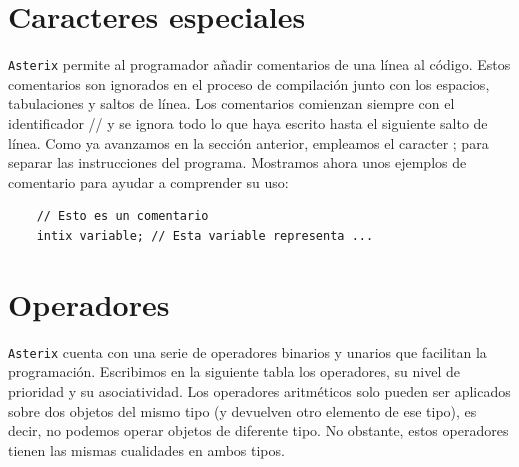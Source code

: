 \documentclass[a4paper, 10pt]{article}
\newcommand{\atx}{\texttt{Asterix} }
\begin{document}
    \section*{Caracteres especiales}
    \atx permite al programador añadir comentarios de una línea al código. Estos
    comentarios son ignorados en el proceso de compilación junto con los espacios,
    tabulaciones y saltos de línea. Los comentarios comienzan siempre con el
    identificador // y se ignora todo lo que haya escrito hasta el siguiente
    salto de línea. Como ya avanzamos en la sección anterior, empleamos el
    caracter \textsc{;} para separar las instrucciones del programa. Mostramos
    ahora unos ejemplos de comentario para ayudar a comprender su uso:

    \begin{verbatim}
    // Esto es un comentario
    intix variable; // Esta variable representa ...
    \end{verbatim}

    \section*{Operadores}
    \atx cuenta con una serie de operadores binarios y unarios que facilitan
    la programación. 
    Escribimos en la siguiente tabla los operadores, su nivel de prioridad y 
    su asociatividad. Los operadores aritméticos solo pueden ser aplicados 
    sobre dos objetos del mismo tipo (y devuelven otro elemento de ese tipo),
    es decir, no podemos operar objetos de diferente tipo. No obstante, estos
    operadores tienen las mismas cualidades en ambos tipos.
\end{document}
